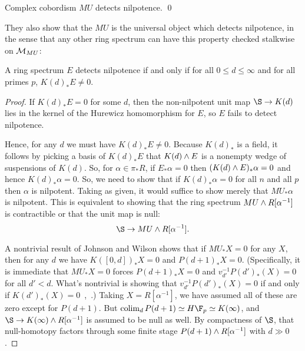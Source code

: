 \begin{theorem}\label{DevinatzHopkinsSmith}
Complex cobordism $MU$ detects nilpotence. \qed
\end{theorem}

They also show that the $MU$ is the universal object which detects nilpotence, in the sense that any other ring spectrum can have this property checked stalkwise on $\mathcal{M}_{MU}$:

\begin{corollary}\label{LocalNilpotenceDetection}
A ring spectrum $E$ detects nilpotence if and only if for all $0 \le d \le \infty$ and for all primes $p$, $K(d)_* E \ne 0$.
\end{corollary}
\begin{proof}
If $K(d)_* E = 0$ for some $d$, then the non-nilpotent unit map $\S \to K(d)$ lies in the kernel of the Hurewicz homomorphism for $E$, so $E$ fails to detect nilpotence.

Hence, for any $d$ we must have $K(d)_* E \ne 0$.  Because $K(d)_*$ is a field, it follows by picking a basis of $K(d)_* E$ that $K(d) \wedge E$ is a nonempty wedge of suspensions of $K(d)$.  So, for $\alpha \in \pi_* R$, if $E_* \alpha = 0$ then $(K(d) \wedge E)_* \alpha = 0$ and hence $K(d)_* \alpha = 0$.  So, we need to show that if $K(d)_* \alpha = 0$ for all $n$ and all $p$ then $\alpha$ is nilpotent.  Taking  as given, it would suffice to show merely that $MU_* \alpha$ is nilpotent.  This is equivalent to showing that the ring spectrum $MU \wedge R[\alpha^{-1}]$ is contractible or that the unit map is null: \[\S \to MU \sm R[\alpha^{-1}].\]

A nontrivial result of Johnson and Wilson shows that if $MU_* X = 0$ for any $X$, then for any $d$ we have $K([0, d])_* X = 0$ and $P(d+1)_* X = 0$.  (Specifically, it is immediate that $MU_* X = 0$ forces $P(d+1)_* X = 0$ and $v_{d'}^{-1} P(d')_*(X) = 0$ for all $d' < d$.  What's nontrivial is showing that $v_{d'}^{-1} P(d')_*(X) = 0$ if and only if $K(d')_*(X) = 0$~\cite[Theorem 2.1.a]{RavenelLocalizationWRTPeriodic},~\cite[Section 3]{JohnsonWilson}.)  Taking $X = R[\alpha^{-1}]$, we have assumed all of these are zero except for $P(d+1)$.  But $\colim_d P(d+1) \simeq H\F_p \simeq K(\infty)$, and $\S \to K(\infty) \sm R[\alpha^{-1}]$ is assumed to be null as well.  By compactness of $\S$, that null-homotopy factors through some finite stage $P(d+1) \wedge R[\alpha^{-1}]$ with $d \gg 0$.
\end{proof}

